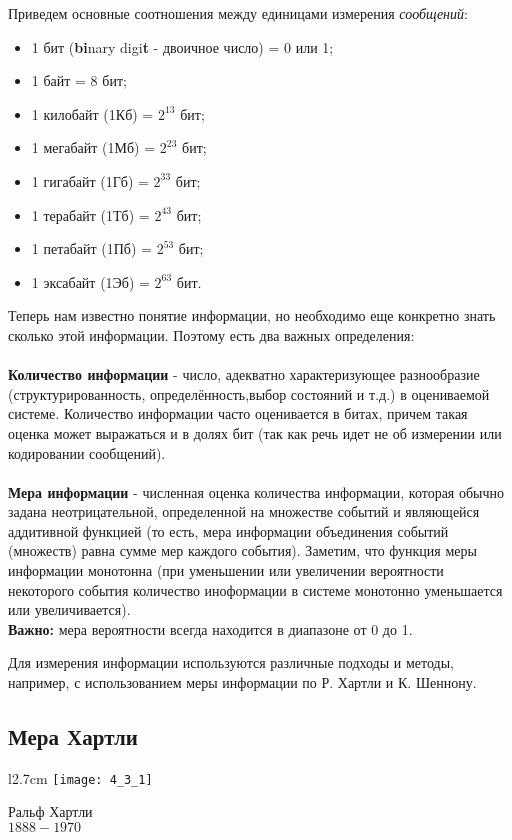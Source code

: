 Приведем основные соотношения между единицами измерения \emph{сообщений}:
\begin{itemize}
\item 1 бит (\textbf{bi}nary digi\textbf{t} - двоичное число) = 0 или 1;
\item 1 байт = 8 бит;
\item 1 килобайт (1Кб) = $2^{13}$ бит;
\item 1 мегабайт (1Мб) = $2^{23}$ бит;
\item 1 гигабайт (1Гб) = $2^{33}$ бит;
\item 1 терабайт (1Тб) = $2^{43}$ бит;
\item 1 петабайт (1Пб) = $2^{53}$ бит;
\item 1 эксабайт (1Эб) = $2^{63}$ бит.
\end{itemize}

Теперь нам известно понятие информации, но необходимо еще конкретно знать сколько этой информации. Поэтому есть два важных определения:
\\
\\\textbf{Количество информации} - число, адекватно характеризующее разнообразие (структурированность, определённость,выбор состояний и т.д.) в оцениваемой системе. Количество информации часто оценивается в битах, причем такая оценка может выражаться и в долях бит (так как речь идет не об измерении или кодировании сообщений).
\\
\\\textbf{Мера информации} - численная оценка количества информации, которая обычно задана неотрицательной, определенной на множестве событий и являющейся аддитивной функцией (то есть, мера информации объединения событий (множеств) равна сумме мер каждого события). Заметим, что функция меры информации монотонна (при уменьшении или увеличении вероятности некоторого события количество иноформации в системе монотонно уменьшается или увеличивается). 
\\\textbf{Важно:} мера вероятности всегда находится в диапазоне от 0 до 1.
\par
Для измерения информации используются различные подходы и методы, например, с использованием меры информации по Р. Хартли и К. Шеннону.

\newpage
\subsection{Мера Хартли}

\begin{wrapfigure}{l}{2.7cm}
\texttt{[image: 4\_3\_1]}
\begin{center}
\footnotesize{Ральф Хартли}
\\\footnotesize{$1888 - 1970$}
\end{center}
\end{wrapfigure}

